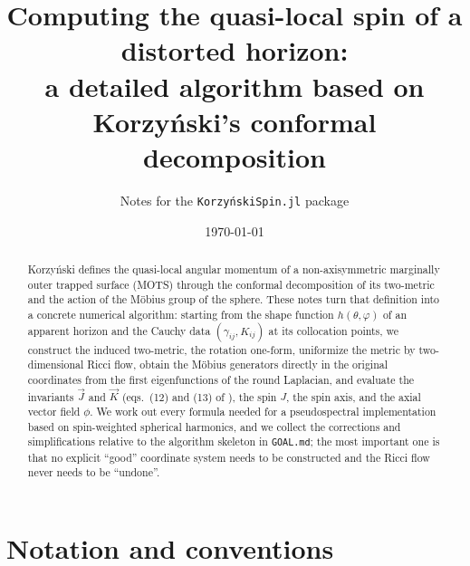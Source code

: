 \documentclass[11pt]{article}
\title{Computing the quasi-local spin of a distorted horizon:\\
a detailed algorithm based on Korzy\'nski's conformal decomposition}
\author{Notes for the \texttt{KorzyńskiSpin.jl} package}
\date{\today}
\newcommand{\vJ}{\vec{J}}
\newcommand{\vK}{\vec{K}}
\begin{document}
\maketitle

\begin{abstract}
Korzy\'nski \cite{korzynski2007} defines the quasi-local angular momentum of a
non-axisymmetric marginally outer trapped surface (MOTS) through the conformal
decomposition of its two-metric and the action of the M\"obius group of the
sphere.  These notes turn that definition into a concrete numerical algorithm:
starting from the shape function $h(\theta,\varphi)$ of an apparent horizon and
the Cauchy data $(\gamma_{ij},K_{ij})$ at its collocation points, we construct
the induced two-metric, the rotation one-form, uniformize the metric by
two-dimensional Ricci flow, obtain the M\"obius generators directly in the
original coordinates from the first eigenfunctions of the round Laplacian, and
evaluate the invariants $\vJ$ and $\vK$ (eqs.\ (12) and (13) of
\cite{korzynski2007}), the spin $J$, the spin axis, and the axial vector field
$\phi$.  We work out every formula needed for a pseudospectral implementation
based on spin-weighted spherical harmonics, and we collect the corrections and
simplifications relative to the algorithm skeleton in \texttt{GOAL.md}; the
most important one is that no explicit ``good'' coordinate system needs to be
constructed and the Ricci flow never needs to be ``undone''.
\end{abstract}

\tableofcontents

\section{Notation and conventions}
\label{sec:conventions}
\end{document}
